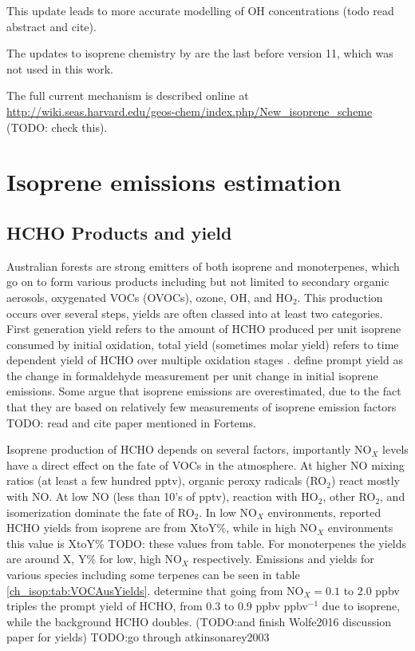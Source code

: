    
    This update leads to more accurate modelling of OH concentrations \citep{Mao2012} (todo read abstract and cite).
    
    The updates to isoprene chemistry by \citet{Mao2013} are the last before version 11, which was not used in this work.

    The full current mechanism is described online at \url{http://wiki.seas.harvard.edu/geos-chem/index.php/New_isoprene_scheme} (TODO: check this).
    

\section{Isoprene emissions estimation}
\label{ch_isop:sec:IsopreneEmissions}

  \subsection{HCHO Products and yield}
    Australian forests are strong emitters of both isoprene and monoterpenes, which go on to form various products including but not limited to secondary organic aerosols, oxygenated VOCs (OVOCs), ozone, OH, and HO$_2$.
    This production occurs over several steps, yields are often classed into at least two categories.
    First generation yield refers to the amount of HCHO produced per unit isoprene consumed by initial oxidation, total yield (sometimes molar yield) refers to time dependent yield of HCHO over multiple oxidation stages \citep{Wolfe2016}.
    \citet{Wolfe2016} define prompt yield as the change in formaldehyde measurement per unit change in initial isoprene emissions.
    Some argue that isoprene emissions are overestimated, due to the fact that they are based on relatively few measurements of isoprene emission factors \citep{Winters2009, FortemsCheiney2012} TODO: read and cite paper mentioned in Fortems.
    
    Isoprene production of HCHO depends on several factors, importantly NO$_X$ levels have a direct effect on the fate of VOCs in the atmosphere.
    At higher NO mixing ratios (at least a few hundred pptv), organic peroxy radicals (RO$_2$) react mostly with NO. 
    At low NO (less than 10's of pptv), reaction with HO$_2$, other RO$_2$, and isomerization dominate the fate of RO$_2$.
    In low NO$_X$ environments, reported HCHO yields from isoprene are from XtoY\%, while in high NO$_X$ environments this value is XtoY\% TODO: these values from table.
    For monoterpenes the yields are around X, Y\% for low, high NO$_X$ respectively.
    Emissions and yields for various species including some terpenes can be seen in table \ref{ch_isop:tab:VOCAusYields}.
    \citet{Wolfe2016} determine that going from NO$_X = 0.1$ to $2.0$ ppbv triples the prompt yield of HCHO, from 0.3 to 0.9 ppbv ppbv$^{-1}$ due to isoprene, while the background HCHO doubles.
    (TODO:and finish Wolfe2016 discussion paper for yields)
    TODO:go through atkinsonarey2003
    
